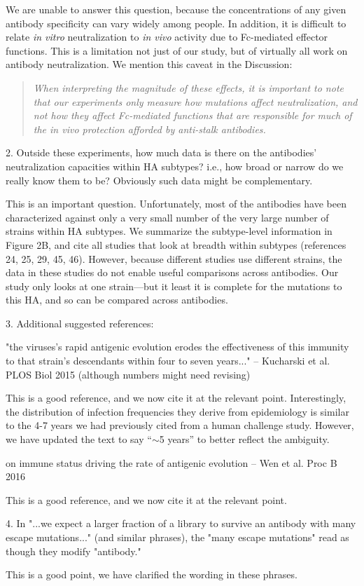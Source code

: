 \documentclass[11pt, oneside]{article}   	%
\begin{document}
{\color{black}
We are unable to answer this question, because the concentrations of any given antibody specificity can vary widely among people.
In addition, it is difficult to relate \textit{in vitro} neutralization to \textit{in vivo} activity due to Fc-mediated effector functions.
This is a limitation not just of our study, but of virtually all work on antibody neutralization.
We mention this caveat in the Discussion:
\begin{quote}
\textsl{When interpreting the magnitude of these effects, it is important to note that our experiments only measure how mutations affect neutralization, and not how they affect Fc-mediated functions that are responsible for much of the in vivo protection afforded by anti-stalk antibodies.}
\end{quote}
}

2. Outside these experiments, how much data is there on the antibodies' neutralization capacities within HA subtypes? i.e., how broad or narrow do we really know them to be? Obviously such data might be complementary. 

{\color{black}
This is an important question.
Unfortunately, most of the antibodies have been characterized against only a very small number of the very large number of strains within HA subtypes.
We summarize the subtype-level information in Figure 2B, and cite all studies that look at breadth within subtypes (references 24, 25, 29, 45, 46).
However, because different studies use different strains, the data in these studies do not enable useful comparisons across antibodies.
Our study only looks at one strain---but it least it is complete for the mutations to this HA, and so can be compared across antibodies.}

3. Additional suggested references: 

"the viruses's rapid antigenic evolution erodes the effectiveness of this immunity to that strain's descendants within four to seven years..." -- Kucharski et al. PLOS Biol 2015 (although numbers might need revising)

{\color{black}
This is a good reference, and we now cite it at the relevant point.
Interestingly, the distribution of infection frequencies they derive from epidemiology is similar to the 4-7 years we had previously cited from a human challenge study.
However, we have updated the text to say ``$\sim$5 years'' to better reflect the ambiguity.}

on immune status driving the rate of antigenic evolution -- Wen et al. Proc B 2016

{\color{black}
This is a good reference, and we now cite it at the relevant point.}

4. In "...we expect a larger fraction of a library to survive an antibody with many escape mutations..." (and similar phrases), the "many escape mutations" read as though they modify "antibody."

{\color{black}
This is a good point, we have clarified the wording in these phrases.}
\end{document}

